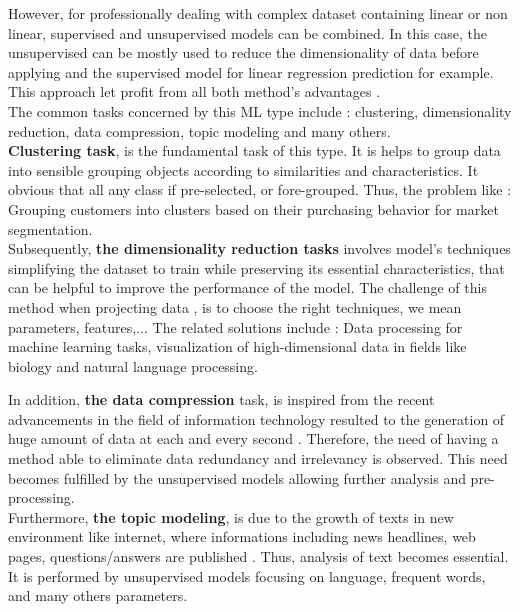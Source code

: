 \documentclass[12pt,a4paper, oneside]{book}
\begin{document}
However, for professionally dealing with complex dataset containing linear or non linear, supervised and unsupervised models can be combined. In this case, the unsupervised can be mostly used to reduce the dimensionality of data before applying and the supervised model for linear regression prediction for example. This approach let profit from all both method's advantages \citep{liu2000interactive}.\\ 

The common tasks concerned by this ML type include : clustering, dimensionality reduction, data compression, topic modeling and many others. \\

\textbf{Clustering task}, is the fundamental task of this type. It is helps to group data into sensible grouping objects according to similarities and  characteristics. It obvious that all any class if pre-selected, or fore-grouped. Thus, the problem like : Grouping customers into clusters based on their purchasing behavior for market segmentation.\\

Subsequently, \textbf{the dimensionality reduction tasks} involves  model's techniques simplifying  the dataset to train while preserving its essential characteristics, that can be helpful to improve the performance of the model. The challenge of this method when projecting data \citep{sorzano2014survey}, is to choose the right techniques, we mean parameters, features,...  The related solutions include : Data processing for machine learning tasks, visualization of high-dimensional data in fields like biology and natural language processing. 

In addition, \textbf{the data compression} task, is inspired from the recent advancements in the field of information technology resulted to the generation of huge amount of data at each and every second \citep{jayasankar2021survey} . Therefore, the need of having a method able to eliminate data redundancy and irrelevancy is observed. This need becomes fulfilled by the unsupervised models allowing further analysis and pre-processing.\\

Furthermore, \textbf{the topic modeling}, is due to the growth of texts in new environment like internet, where informations including news headlines, web pages, questions/answers are published \citep{qiang2020short}. Thus, analysis of text becomes essential. It is performed by unsupervised models focusing on language, frequent words, and many others parameters.\\
\end{document}

